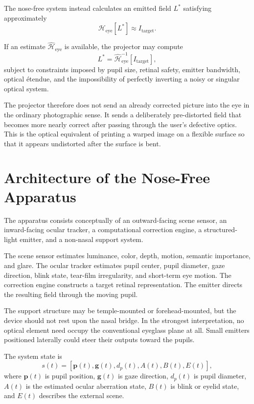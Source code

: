 \documentclass[11pt]{article}
\begin{document}
The nose-free system instead calculates an emitted field $L^\ast$ satisfying approximately
\[
\mathcal{H}_{\mathrm{eye}}[L^\ast]\approx I_{\mathrm{target}}.
\]

If an estimate $\widehat{\mathcal{H}}_{\mathrm{eye}}$ is available, the projector may compute
\[
L^\ast=\widehat{\mathcal{H}}_{\mathrm{eye}}^{-1}[I_{\mathrm{target}}],
\]
subject to constraints imposed by pupil size, retinal safety, emitter bandwidth, optical \'{e}tendue, and the impossibility of perfectly inverting a noisy or singular optical system.

The projector therefore does not send an already corrected picture into the eye in the ordinary photographic sense. It sends a deliberately pre-distorted field that becomes more nearly correct after passing through the user's defective optics. This is the optical equivalent of printing a warped image on a flexible surface so that it appears undistorted after the surface is bent.

\section{Architecture of the Nose-Free Apparatus}

The apparatus consists conceptually of an outward-facing scene sensor, an inward-facing ocular tracker, a computational correction engine, a structured-light emitter, and a non-nasal support system.

The scene sensor estimates luminance, color, depth, motion, semantic importance, and glare. The ocular tracker estimates pupil center, pupil diameter, gaze direction, blink state, tear-film irregularity, and short-term eye motion. The correction engine constructs a target retinal representation. The emitter directs the resulting field through the moving pupil.

The support structure may be temple-mounted or forehead-mounted, but the device should not rest upon the nasal bridge. In the strongest interpretation, no optical element need occupy the conventional eyeglass plane at all. Small emitters positioned laterally could steer their outputs toward the pupils.

The system state is
\[
s(t)=[\mathbf{p}(t),\mathbf{g}(t),d_p(t),A(t),B(t),E(t)],
\]
where $\mathbf{p}(t)$ is pupil position, $\mathbf{g}(t)$ is gaze direction, $d_p(t)$ is pupil diameter, $A(t)$ is the estimated ocular aberration state, $B(t)$ is blink or eyelid state, and $E(t)$ describes the external scene.
\end{document}
